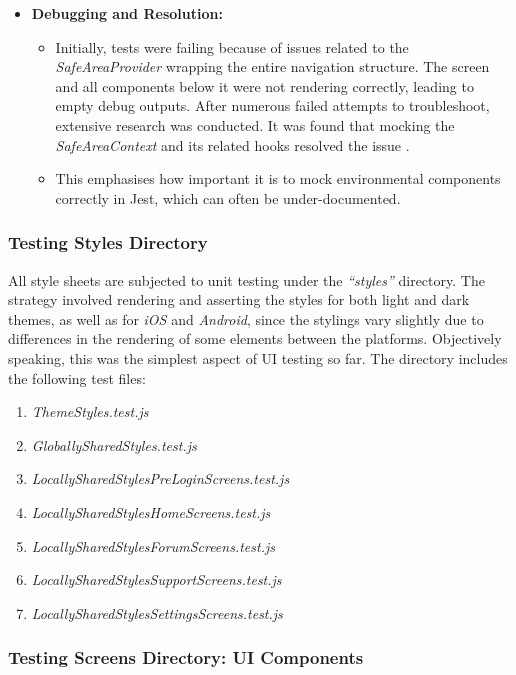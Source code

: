 \begin{itemize}
    \item \textbf{Debugging and Resolution:}
    \begin{itemize}
        \item Initially, tests were failing because of issues related to the \textit{SafeAreaProvider} wrapping the entire navigation structure. The screen and all components below it were not rendering correctly, leading to empty debug outputs. After numerous failed attempts to troubleshoot, extensive research was conducted. It was found that mocking the \textit{SafeAreaContext} and its related hooks resolved the issue \cite{StackOverflowSafeAreaContextIssue2021, GithubSafeAreaContextIssue2019}.
        \item This emphasises how important it is to mock environmental components correctly in Jest, which can often be under-documented.
    \end{itemize}
\end{itemize}

\subsubsection{Testing Styles Directory}

All style sheets are subjected to unit testing under the \textit{``styles''} directory. The strategy involved rendering and asserting the styles for both light and dark themes, as well as for \textit{iOS} and \textit{Android}, since the stylings vary slightly due to differences in the rendering of some elements between the platforms. Objectively speaking, this was the simplest aspect of UI testing so far. The directory includes the following test files:

\begin{enumerate}
    \item \textit{ThemeStyles.test.js}
    \item \textit{GloballySharedStyles.test.js}
    \item \textit{LocallySharedStylesPreLoginScreens.test.js}
    \item \textit{LocallySharedStylesHomeScreens.test.js}
    \item \textit{LocallySharedStylesForumScreens.test.js}
    \item \textit{LocallySharedStylesSupportScreens.test.js}
    \item \textit{LocallySharedStylesSettingsScreens.test.js}
\end{enumerate}

\subsubsection{Testing Screens Directory: UI Components}

